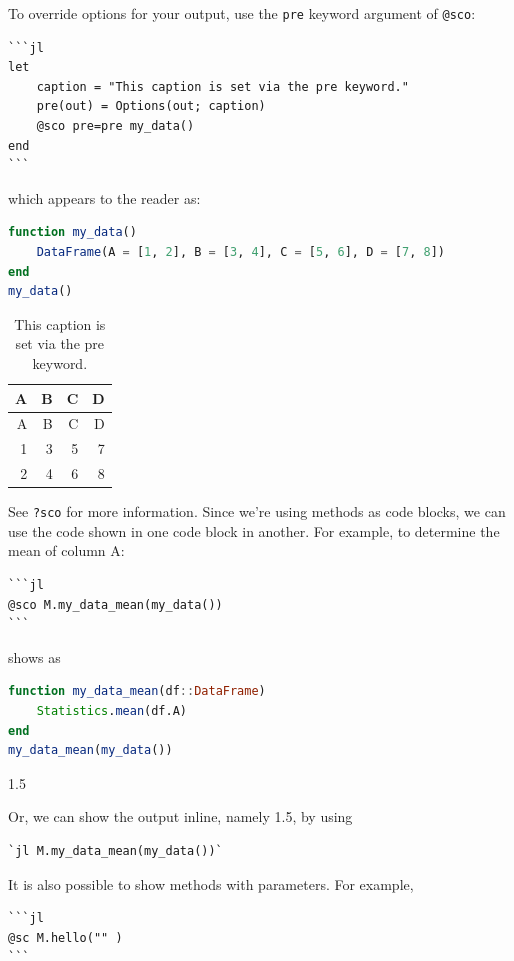\documentclass[
  notoc %
]{tufte-book}
\newcommand{\passthrough}[1]{#1}
\begin{document}
To override options for your output, use the
\passthrough{\lstinline!pre!} keyword argument of
\passthrough{\lstinline!@sco!}:

\begin{lstlisting}
```jl
let
    caption = "This caption is set via the pre keyword."
    pre(out) = Options(out; caption)
    @sco pre=pre my_data()
end
```
\end{lstlisting}

which appears to the reader as:

\begin{lstlisting}[language=Julia]
function my_data()
    DataFrame(A = [1, 2], B = [3, 4], C = [5, 6], D = [7, 8])
end
my_data()
\end{lstlisting}

\begin{longtable}[]{@{}rrrr@{}}
\caption{This caption is set via the pre keyword.}\tabularnewline
\toprule
A & B & C & D \\
\midrule
\endfirsthead
\toprule
A & B & C & D \\
\midrule
\endhead
1 & 3 & 5 & 7 \\
2 & 4 & 6 & 8 \\
\bottomrule
\end{longtable}

See \passthrough{\lstinline!?sco!} for more information. Since we're
using methods as code blocks, we can use the code shown in one code
block in another. For example, to determine the mean of column A:

\begin{lstlisting}
```jl
@sco M.my_data_mean(my_data())
```
\end{lstlisting}

shows as

\begin{lstlisting}[language=Julia]
function my_data_mean(df::DataFrame)
    Statistics.mean(df.A)
end
my_data_mean(my_data())
\end{lstlisting}

1.5

Or, we can show the output inline, namely 1.5, by using

\begin{lstlisting}
`jl M.my_data_mean(my_data())`
\end{lstlisting}

It is also possible to show methods with parameters. For example,

\begin{lstlisting}
```jl
@sc M.hello("" )
```
\end{lstlisting}
\end{document}
